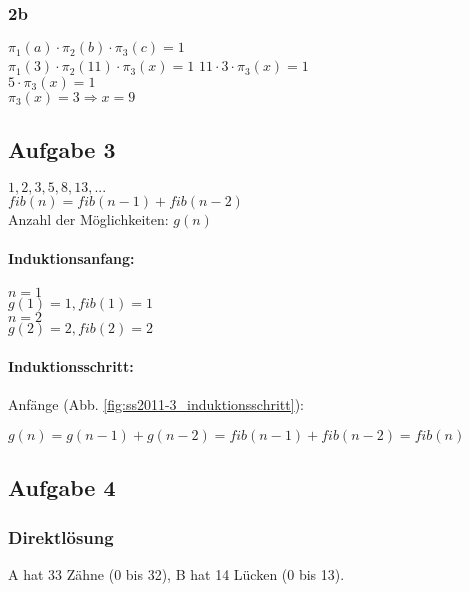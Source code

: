 \subsubsection{2b}
$\pi_1(a) \cdot  \pi_2(b) \cdot  \pi_3(c) = 1$ \\
$\pi_1(3) \cdot  \pi_2(11) \cdot  \pi_3(x) = 1$
$11 \cdot  3 \cdot  \pi_3(x) =1$\\
$5 \cdot  \pi_3(x)=1$ \\
$\pi_3(x) =3 \Rightarrow x=9$ 

\subsection{Aufgabe 3}
$1,2,3,5,8,13,...$\\
$fib(n)=fib(n-1)+fib(n-2)$\\
Anzahl der Möglichkeiten: $g(n)$\\

\paragraph{Induktionsanfang:} 


$n=1$\\
$g(1)=1, fib(1)=1$\\

$n=2$\\
$g(2)=2, fib(2)=2$\\

\paragraph{Induktionsschritt:} Anfänge (Abb. \ref{fig:ss2011-3_induktionsschritt}):


$g(n)=g(n-1)+g(n-2)=fib(n-1)+fib(n-2)=fib(n)$

\subsection{Aufgabe 4}

\subsubsection{Direktlösung}
A hat 33 Zähne (0 bis 32), B hat 14 Lücken (0 bis 13). 

